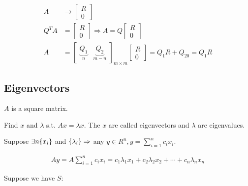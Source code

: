 \begin{align*}
  A &\to \begin{bmatrix}
    R \\ 0
  \end{bmatrix} \\
  Q^T A &= \begin{bmatrix}
    R \\0
  \end{bmatrix} \Rightarrow A = Q \begin{bmatrix}
    R \\ 0
  \end{bmatrix} \\
  A &= \begin{bmatrix}
    \underbrace{Q_1}_{n} & \underbrace{Q_2}_{m-n}
  \end{bmatrix}_{m \times m}
  \begin{bmatrix}
    R \\ 0
  \end{bmatrix} =
  Q_1 R + Q_20 = Q_1 R
\end{align*}

\subsection{Eigenvectors}

$A$ is a square matrix.

Find $x$ and $\lambda$ s.t. $Ax = \lambda x$. The $x$ are called eigenvectors and $\lambda$ are eigenvalues.

Suppose $\exists n \{x_i\}$ and $\{\lambda_i\} \Rightarrow$ any $y \in R^n, y = \sum_{i=1}^n c_i x_i$.

\begin{align*}
  Ay = A\sum_{i=1}^n c_i x_i = c_1 \lambda_1 x_1 + c_2 \lambda_2 x_2 + \cdots +c_n \lambda_n x_n
\end{align*}

Suppose we have $S$:

